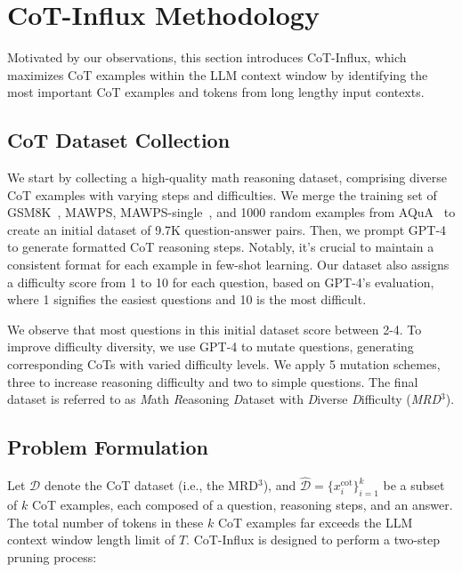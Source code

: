 \section{{CoT-Influx} Methodology}

Motivated by our observations, this section introduces {CoT-Influx}, which maximizes CoT examples within the LLM context window by identifying the most important CoT examples and tokens from long lengthy input contexts. 

\subsection{CoT Dataset Collection}

\label{sec:dataset}
We start by collecting a high-quality math reasoning dataset, comprising diverse CoT examples with varying steps and difficulties. We merge the training set of GSM8K~\cite{gsm8k}, MAWPS, MAWPS-single~\cite{mawps}, and 1000 random examples from AQuA~\cite{ling2017program} to create an initial dataset of 9.7K question-answer pairs. Then, we prompt GPT-4 to generate formatted CoT reasoning steps. Notably, it's crucial to maintain a consistent format for each example in few-shot learning.  Our dataset also assigns a difficulty score from 1 to 10 for each question, based on GPT-4's evaluation, where 1 signifies the easiest questions and 10 is the most difficult. 

We observe that most questions in this initial dataset score between 2-4. To improve difficulty diversity, we use GPT-4 to mutate questions, generating corresponding CoTs with varied difficulty levels. We apply 5 mutation schemes, three to increase reasoning difficulty and two to simple questions. The final dataset is referred to as \textit{M}ath \textit{R}easoning \textit{D}ataset with \textit{D}iverse \textit{D}ifficulty (\textit{MRD$^3$}). 

\subsection{Problem Formulation}
\label{sec:problem_formulation}

Let $\mathcal{D}$ denote the  CoT dataset (i.e., the MRD$^3$), and $\hat{\mathcal{D}}=\{x^\text{cot}_i\}_{i=1}^k$ be a subset of $k$ CoT examples, each composed of a question, reasoning steps, and an answer. The total number of tokens in these $k$ CoT examples far exceeds the LLM context window length limit of $T$.    {CoT-Influx} is designed to perform a two-step pruning process:

